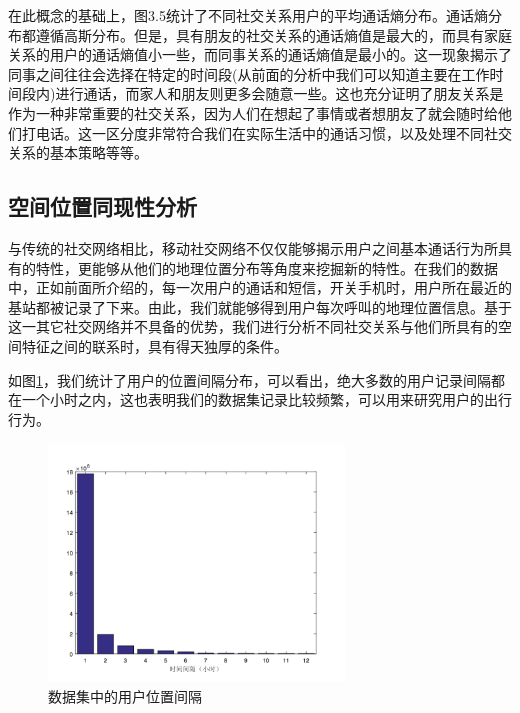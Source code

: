 在此概念的基础上，图3.5统计了不同社交关系用户的平均通话熵分布。通话熵分布都遵循高斯分布。但是，具有朋友的社交关系的通话熵值是最大的，而具有家庭关系的用户的通话熵值小一些，而同事关系的通话熵值是最小的。这一现象揭示了同事之间往往会选择在特定的时间段(从前面的分析中我们可以知道主要在工作时间段内)进行通话，而家人和朋友则更多会随意一些。这也充分证明了朋友关系是作为一种非常重要的社交关系，因为人们在想起了事情或者想朋友了就会随时给他们打电话。这一区分度非常符合我们在实际生活中的通话习惯，以及处理不同社交关系的基本策略等等。

\subsection{空间位置同现性分析}

与传统的社交网络相比，移动社交网络不仅仅能够揭示用户之间基本通话行为所具有的特性，更能够从他们的地理位置分布等角度来挖掘新的特性。在我们的数据中，正如前面所介绍的，每一次用户的通话和短信，开关手机时，用户所在最近的基站都被记录了下来。由此，我们就能够得到用户每次呼叫的地理位置信息。基于这一其它社交网络并不具备的优势，我们进行分析不同社交关系与他们所具有的空间特征之间的联系时，具有得天独厚的条件。

如图\ref{fig-position-stamp}，我们统计了用户的位置间隔分布，可以看出，绝大多数的用户记录间隔都在一个小时之内，这也表明我们的数据集记录比较频繁，可以用来研究用户的出行行为。

\begin{figure}[ht]
    \centering
    \includegraphics[scale=1, width=0.7\textwidth]{figure/timestamp.PNG}
    \caption{数据集中的用户位置间隔}
    \label{fig-position-stamp}
\end{figure}


